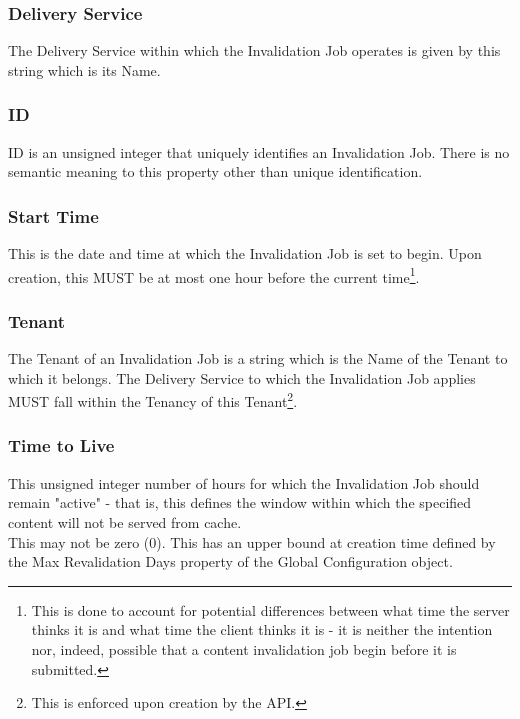 \subsubsection{Delivery Service}
The Delivery Service within which the Invalidation Job operates is given by this
string which is its Name.

\subsubsection{ID}
ID is an unsigned integer that uniquely identifies an Invalidation Job. There is
no semantic meaning to this property other than unique identification.

\subsubsection{Start Time}
This is the date and time at which the Invalidation Job is set to begin. Upon
creation, this MUST be at most one hour before the current time\footnote{This is
done to account for potential differences between what time the server thinks it
is and what time the client thinks it is - it is neither the intention nor,
indeed, possible that a content invalidation job begin before it is submitted.}.

\subsubsection{Tenant}
The Tenant of an Invalidation Job is a string which is the Name of the Tenant to which it belongs. The Delivery Service to which the Invalidation Job applies
MUST fall within the Tenancy of this Tenant\footnote{This is enforced upon
creation by the API.}.

\subsubsection{Time to Live}
This unsigned integer number of hours for which the Invalidation Job should
remain "active" - that is, this defines the window within which the specified
content will not be served from cache.\\
This may not be zero ($0$). This has an upper bound at creation time defined by
the Max Revalidation Days property of the Global Configuration object.
